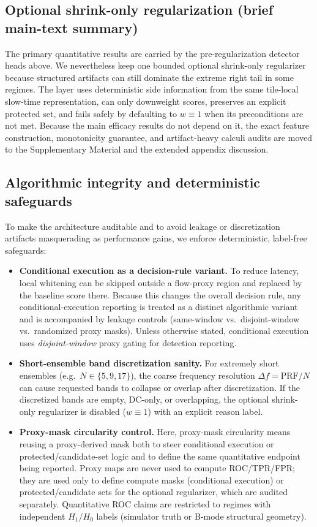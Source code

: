 \documentclass[11pt]{article}
\begin{document}
\subsection{Optional shrink-only regularization (brief main-text summary)}
\noindent The primary quantitative results are carried by the pre-regularization detector heads above. We nevertheless keep one bounded optional shrink-only regularizer because structured artifacts can still dominate the extreme right tail in some regimes. The layer uses deterministic side information from the same tile-local slow-time representation, can only downweight scores, preserves an explicit protected set, and fails safely by defaulting to $w\equiv 1$ when its preconditions are not met. Because the main efficacy results do not depend on it, the exact feature construction, monotonicity guarantee, and artifact-heavy calculi audits are moved to the Supplementary Material and the extended appendix discussion.

\subsection{Algorithmic integrity and deterministic safeguards}
To make the architecture auditable and to avoid leakage or discretization artifacts masquerading as performance gains, we enforce deterministic, label-free safeguards:
\begin{itemize}[nosep]
  \item \textbf{Conditional execution as a decision-rule variant.} To reduce latency, local whitening can be skipped outside a flow-proxy region and replaced by the baseline score there. Because this changes the overall decision rule, any conditional-execution reporting is treated as a distinct algorithmic variant and is accompanied by leakage controls (same-window vs.\ disjoint-window vs.\ randomized proxy masks). Unless otherwise stated, conditional execution uses \emph{disjoint-window} proxy gating for detection reporting.
  \item \textbf{Short-ensemble band discretization sanity.} For extremely short ensembles (e.g.\ $N\in\{5,9,17\}$), the coarse frequency resolution $\Delta f=\mathrm{PRF}/N$ can cause requested bands to collapse or overlap after discretization. If the discretized bands are empty, DC-only, or overlapping, the optional shrink-only regularizer is disabled ($w\equiv 1$) with an explicit reason label.
  \item \textbf{Proxy-mask circularity control.} Here, proxy-mask circularity means reusing a proxy-derived mask both to steer conditional execution or protected/candidate-set logic and to define the same quantitative endpoint being reported. Proxy maps are never used to compute ROC/TPR/FPR; they are used only to define compute masks (conditional execution) or protected/candidate sets for the optional regularizer, which are audited separately. Quantitative ROC claims are restricted to regimes with independent $H_1/H_0$ labels (simulator truth or B-mode structural geometry).
\end{itemize}
\end{document}
